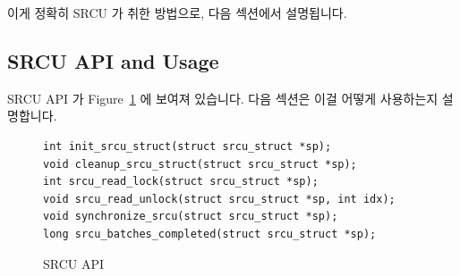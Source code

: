 이게 정확히 SRCU 가 취한 방법으로, 다음 섹션에서 설명됩니다.

\subsection{SRCU API and Usage}
\label{sec:app:rcuimpl:SRCU API and Usage}

SRCU API 가 Figure~\ref{fig:app:rcuimpl:SRCU API} 에 보여져 있습니다.
다음 섹션은 이걸 어떻게 사용하는지 설명합니다.

\begin{figure}[htbp]
{ \scriptsize
\begin{verbatim}
int init_srcu_struct(struct srcu_struct *sp);
void cleanup_srcu_struct(struct srcu_struct *sp);
int srcu_read_lock(struct srcu_struct *sp);
void srcu_read_unlock(struct srcu_struct *sp, int idx);
void synchronize_srcu(struct srcu_struct *sp);
long srcu_batches_completed(struct srcu_struct *sp);
\end{verbatim}
}
\caption{SRCU API}
\label{fig:app:rcuimpl:SRCU API}
\end{figure}

